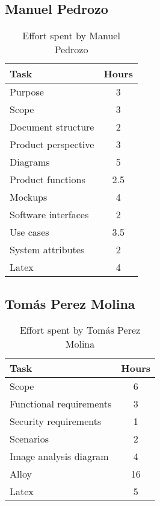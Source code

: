 \subsection{Manuel Pedrozo}

\begin{table}[H]
    \centering
    \begin{tabular}{|p{7cm}|c|}
    \hline
    \textbf{Task} & \textbf{Hours} \\ \hline
    Purpose & 3 \\ \hline
    Scope & 3 \\ \hline
    Document structure & 2 \\ \hline
    Product perspective & 3 \\ \hline
    Diagrams & 5 \\ \hline
    Product functions & 2.5 \\ \hline
    Mockups & 4 \\ \hline
    Software interfaces & 2 \\ \hline
    Use cases & 3.5 \\ \hline
    System attributes & 2 \\ \hline
    Latex & 4 \\ \hline
    \end{tabular}
    \caption{\label{tbl:manuel-effort} Effort spent by Manuel Pedrozo}
    \end{table}

\subsection{Tomás Perez Molina}
\begin{table}[H]
    \centering
    \begin{tabular}{|p{7cm}|c|}
    \hline
    \textbf{Task} & \textbf{Hours} \\ \hline
    Scope & 6 \\ \hline
    Functional requirements & 3 \\ \hline
    Security requirements & 1 \\ \hline
    Scenarios & 2 \\ \hline
    Image analysis diagram & 4 \\ \hline
    Alloy & 16 \\ \hline
    Latex & 5 \\ \hline
    \end{tabular}
    \caption{\label{tbl:tomas-effort} Effort spent by Tomás Perez Molina}
    \end{table}
